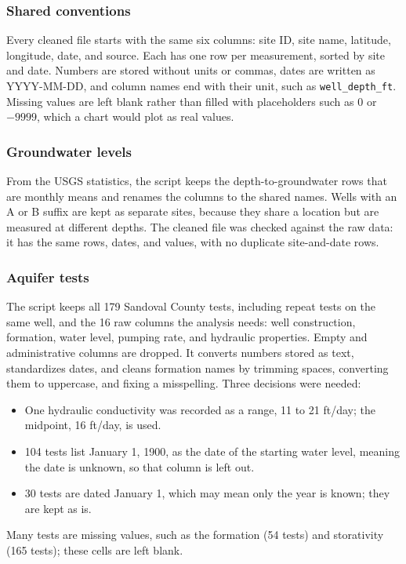 \documentclass[10pt,twocolumn,letterpaper]{article}
\begin{document}
\subsubsection{Shared conventions}
Every cleaned file starts with the same six columns: site ID, site name, latitude, longitude,
date, and source. Each has one row per measurement, sorted by site and date. Numbers are stored
without units or commas, dates are written as \mbox{YYYY-MM-DD}, and column names end with their unit,
such as \texttt{well\_depth\_ft}. Missing values are left blank rather than filled with
placeholders such as 0 or $-9999$, which a chart would plot as real values.

\subsubsection{Groundwater levels}
From the USGS statistics, the script keeps the depth-to-groundwater rows that are monthly means
and renames the columns to the shared names. Wells with an A or B suffix are kept as separate
sites, because they share a location but are measured at different depths. The cleaned file was
checked against the raw data: it has the same rows, dates, and values, with no duplicate
site-and-date rows.

\subsubsection{Aquifer tests}
The script keeps all 179 Sandoval County tests, including repeat tests on the same well, and the
16 raw columns the analysis needs: well construction, formation, water level, pumping rate, and
hydraulic properties. Empty and administrative columns are dropped. It converts numbers stored as
text, standardizes dates, and cleans formation names by trimming spaces, converting them to
uppercase, and fixing a misspelling. Three decisions were needed:
\begin{itemize}
  \item One hydraulic conductivity was recorded as a range, 11 to 21 ft/day; the midpoint,
        16 ft/day, is used.
  \item 104 tests list January 1, 1900, as the date of the starting water level, meaning the
        date is unknown, so that column is left out.
  \item 30 tests are dated January 1, which may mean only the year is known; they are kept as is.
\end{itemize}
Many tests are missing values, such as the formation (54 tests) and storativity (165 tests); these
cells are left blank.
\end{document}
